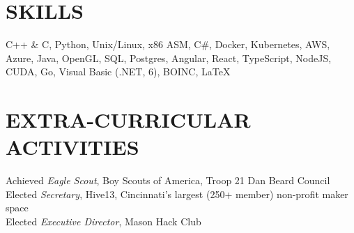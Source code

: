 \documentclass[margin]{res} %
\begin{document}
\begin{resume}
\section{SKILLS} 
 
C++ \& C, Python, Unix/Linux, x86 ASM, C\#, Docker, Kubernetes, AWS, Azure, Java, OpenGL, SQL, Postgres, Angular, React, TypeScript, NodeJS, CUDA, Go, Visual Basic (.NET, 6), BOINC, \LaTeX 


\section{EXTRA-CURRICULAR \\ ACTIVITIES} 

Achieved {\it Eagle Scout}, Boy Scouts of America, Troop 21 Dan Beard Council \\
Elected {\it Secretary}, Hive13, Cincinnati's largest (250+ member) non-profit maker space \\
Elected {\it Executive Director}, Mason Hack Club \\


\end{resume}
\end{document}

